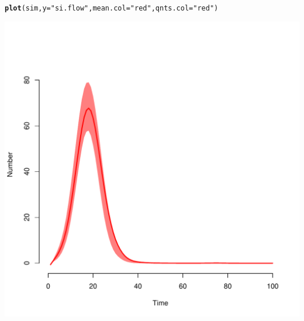 \documentclass{article}\usepackage[]{graphicx}\usepackage[]{color}
\makeatletter
\def\maxwidth{ %
  \ifdim\Gin@nat@width>\linewidth
    \linewidth
  \else
    \Gin@nat@width
  \fi
}
\newcommand{\hlstr}[1]{\textcolor[rgb]{0.192,0.494,0.8}{#1}}%
\newcommand{\hlstd}[1]{\textcolor[rgb]{0.345,0.345,0.345}{#1}}%
\newcommand{\hlkwc}[1]{\textcolor[rgb]{0.333,0.667,0.333}{#1}}%
\newcommand{\hlkwd}[1]{\textcolor[rgb]{0.737,0.353,0.396}{\textbf{#1}}}%
\newenvironment{kframe}{%
 \def\at@end@of@kframe{}%
 \ifinner\ifhmode%
  \def\at@end@of@kframe{\end{minipage}}%
  \begin{minipage}{\columnwidth}%
 \fi\fi%
 \def\FrameCommand##1{\hskip\@totalleftmargin \hskip-\fboxsep
 \colorbox{shadecolor}{##1}\hskip-\fboxsep
     \hskip-\linewidth \hskip-\@totalleftmargin \hskip\columnwidth}%
 \MakeFramed {\advance\hsize-\width
   \@totalleftmargin\z@ \linewidth\hsize
   \@setminipage}}%
 {\par\unskip\endMakeFramed%
 \at@end@of@kframe}
\newenvironment{knitrout}{}{} %
\makeatother
\begin{document}
\begin{knitrout}
\color{fgcolor}\begin{kframe}
\begin{alltt}
\hlkwd{plot}\hlstd{(sim,} \hlkwc{y} \hlstd{=} \hlstr{"si.flow"}\hlstd{,} \hlkwc{mean.col} \hlstd{=} \hlstr{"red"}\hlstd{,} \hlkwc{qnts.col} \hlstd{=} \hlstr{"red"}\hlstd{)}
\end{alltt}
\end{kframe}
\includegraphics[width=\maxwidth]{figure/unnamed-chunk-13-1} 

\end{knitrout}
\end{document}
